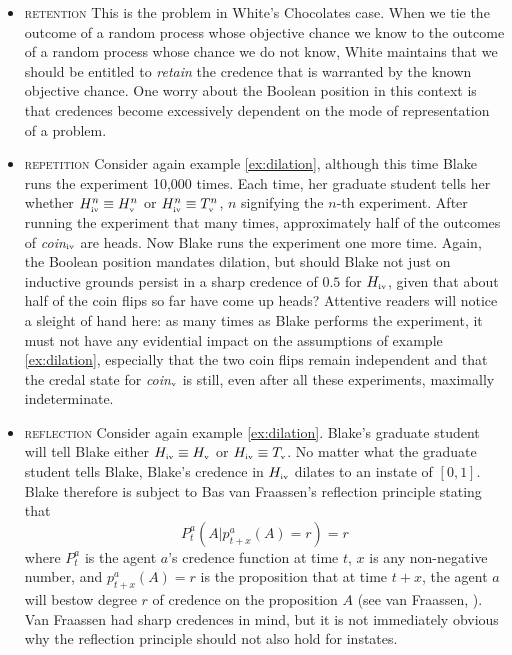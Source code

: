 \documentclass[12pt]{article}
\begin{document}
\begin{itemize}
\item \textsc{retention} This is the problem in White's Chocolates
  case. When we tie the outcome of a random process whose objective
  chance we know to the outcome of a random process whose chance we do
  not know, White maintains that we should be entitled to
  \emph{retain} the credence that is warranted by the known objective
  chance. One worry about the Boolean position in this context is that
  credences become excessively dependent on the mode of representation
  of a problem.
\item \textsc{repetition} Consider again example \ref{ex:dilation},
  although this time Blake runs the experiment 10,000 times. Each
  time, her graduate student tells her whether
  $H^{n}_{\mbox{\tiny{iv}}}\equiv{}H^{n}_{\mbox{\tiny{v}}}$ or
  $H^{n}_{\mbox{\tiny{iv}}}\equiv{}T^{n}_{\mbox{\tiny{v}}}$, $n$
  signifying the $n$-th experiment. After running the experiment that
  many times, approximately half of the outcomes of
  \textit{coin}$_{\mbox{\tiny{iv}}}$ are heads. Now Blake runs the
  experiment one more time. Again, the Boolean position mandates
  dilation, but should Blake not just on inductive grounds persist in
  a sharp credence of $0.5$ for $H_{\mbox{\tiny{iv}}}$, given that
  about half of the coin flips so far have come up heads? Attentive
  readers will notice a sleight of hand here: as many times as Blake
  performs the experiment, it must not have any evidential impact on
  the assumptions of example \ref{ex:dilation}, especially that the
  two coin flips remain independent and that the credal state for
  \textit{coin}$_{\mbox{\tiny{v}}}$ is still, even after all these
  experiments, maximally indeterminate.
\item \textsc{reflection} Consider again example \ref{ex:dilation}.
  Blake's graduate student will tell Blake either
  $H_{\mbox{\tiny{iv}}}\equiv{}H_{\mbox{\tiny{v}}}$ or
  $H_{\mbox{\tiny{iv}}}\equiv{}T_{\mbox{\tiny{v}}}$. No matter what
  the graduate student tells Blake, Blake's credence in
  $H_{\mbox{\tiny{iv}}}$ dilates to an instate of $[0,1]$. Blake
  therefore is subject to Bas van Fraassen's reflection principle
  stating that
  \begin{equation}
    \label{eq:reflection}
    P_{t}^{a}(A|p_{t+x}^{a}(A)=r)=r
  \end{equation}
  where $P_{t}^{a}$ is the agent $a$'s credence function at time $t$,
  $x$ is any non-negative number, and $p_{t+x}^{a}(A)=r$ is the
  proposition that at time $t+x$, the agent $a$ will bestow degree $r$
  of credence on the proposition $A$ (see van
  Fraassen, ). Van Fraassen had sharp
  credences in mind, but it is not immediately obvious why the
  reflection principle should not also hold for instates.
\end{itemize}
\end{document}
